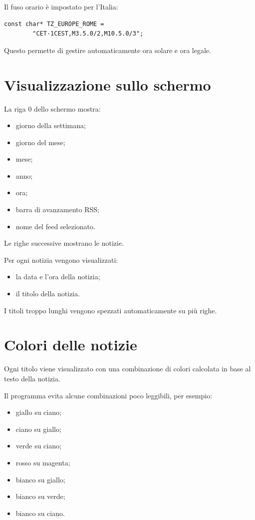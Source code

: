 \documentclass[11pt,a4paper]{article}
\begin{document}
	Il fuso orario è impostato per l'Italia:
	
	\begin{lstlisting}[style=codice]
		const char* TZ_EUROPE_ROME =
		"CET-1CEST,M3.5.0/2,M10.5.0/3";
	\end{lstlisting}
	
	Questo permette di gestire automaticamente ora solare e ora legale.
	
	\section{Visualizzazione sullo schermo}
	
	La riga 0 dello schermo mostra:
	
	\begin{itemize}
		\item giorno della settimana;
		\item giorno del mese;
		\item mese;
		\item anno;
		\item ora;
		\item barra di avanzamento RSS;
		\item nome del feed selezionato.
	\end{itemize}
	
	Le righe successive mostrano le notizie.
	
	Per ogni notizia vengono visualizzati:
	
	\begin{itemize}
		\item la data e l'ora della notizia;
		\item il titolo della notizia.
	\end{itemize}
	
	I titoli troppo lunghi vengono spezzati automaticamente su più righe.
	
	\section{Colori delle notizie}
	
	Ogni titolo viene visualizzato con una combinazione di colori calcolata in base al testo della notizia.
	
	Il programma evita alcune combinazioni poco leggibili, per esempio:
	
	\begin{itemize}
		\item giallo su ciano;
		\item ciano su giallo;
		\item verde su ciano;
		\item rosso su magenta;
		\item bianco su giallo;
		\item bianco su verde;
		\item bianco su ciano.
	\end{itemize}
	
\end{document}
